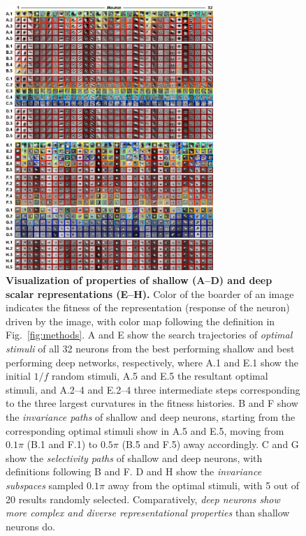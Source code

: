 \documentclass[10pt,twocolumn,letterpaper]{article}
\begin{document}
\begin{figure}
\begin{center}
\includegraphics[width=0.70\textwidth]{Figs/pic1.pdf} 
\end{center}
\caption{{\bf Visualization of properties of shallow (A--D) and deep scalar representations (E--H).}
Color of the boarder of an image indicates the fitness of the representation (\ie response of the neuron) driven by the image, with color map following the definition in Fig.~\ref{fig:methods}.
A and E show the search trajectories of \emph{optimal stimuli} of all 32 neurons from the best performing shallow and best performing deep networks, respectively, where A.1 and E.1 show the initial $1/f$ random stimuli, A.5 and E.5 the resultant optimal stimuli, and A.2--4 and E.2--4 three intermediate steps corresponding to the three largest curvatures in the fitness histories.
B and F show the \emph{invariance paths} of shallow and deep neurons, starting from the corresponding optimal stimuli show in A.5 and E.5, moving from $0.1\pi$ (B.1 and F.1) to $0.5\pi$ (B.5 and F.5) away accordingly.
C and G show the \emph{selectivity paths} of shallow and deep neurons, with definitions following B and F.
D and H show the \emph{invariance subspaces} sampled $0.1\pi$ away from the optimal stimuli, with 5 out of 20 results randomly selected.
Comparatively, \emph{deep neurons show more complex and diverse representational properties} than shallow neurons do.
} %
\label{fig:allrep}
\end{figure}
\end{document}
